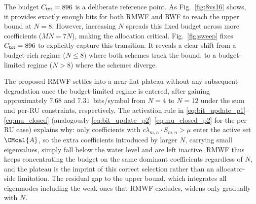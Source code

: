 \documentclass[10pt, twocolumn, comsoc]{IEEEtran}
\begin{document}



The budget $C_{\sf tot}=896$ is a deliberate reference point. 
As Fig.~\ref{fig:8vs16} shows, it provides exactly enough bits for both RMWF and RWF to reach the upper bound at $N=8$.
However, increasing $N$ spreads this fixed budget across more coefficients ($MN=7N$), making the allocation critical. Fig.~\ref{fig:sweep} fixes $C_{\sf tot}=896$ to explicitly capture this transition. 
It reveals a clear shift from a budget-rich regime ($N\le8$) where both schemes track the bound, to a budget-limited regime ($N>8$) where the schemes diverge.

The proposed RMWF settles into a near-flat plateau without any subsequent degradation once the budget-limited regime is entered, after gaining approximately $7.68$ and $7.31$~bits/symbol from $N = 4$ to $N = 12$ under the sum and per-RU constraints, respectively. 
The activation rule in \eqref{eq:bit_update_p1}--\eqref{eq:mu_closed} (analogously \eqref{eq:bit_update_p2}--\eqref{eq:mu_closed_p2} for the per-RU case) explains why: only coefficients with $c\lambda_{m,n} \cdot S_{m,n} > \mu$ enter the active set $\CMcal{A}$, so the extra coefficients introduced by larger $N$, carrying small eigenvalues, simply fall below the water level and are left inactive.
RMWF thus keeps concentrating the budget on the same dominant coefficients regardless of $N$, and the plateau is the imprint of this correct selection rather than an allocator-side limitation. 
The residual gap to the upper bound, which integrates all eigenmodes including the weak ones that RMWF excludes, widens only gradually with $N$.
\end{document}

